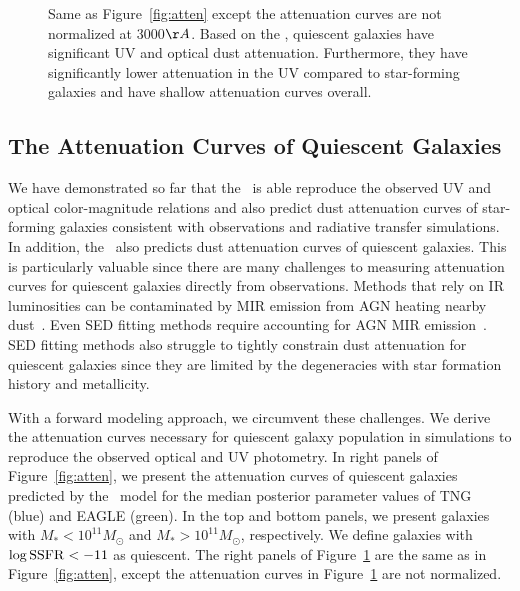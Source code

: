 \begin{figure}
\begin{center}
    \caption{\label{fig:raw_atten}
    Same as Figure~\ref{fig:atten} except the attenuation curves are not
    normalized at 3000$\AA$. Based on the \eda, quiescent galaxies have
    significant UV and optical dust attenuation. Furthermore, they have 
    significantly lower attenuation in the UV compared to star-forming 
    galaxies and have shallow attenuation curves overall.
    }
\end{center}
\end{figure}
\subsection{The Attenuation Curves of Quiescent Galaxies}  
We have demonstrated so far that the \eda~is able reproduce the observed UV and
optical color-magnitude relations and also predict dust attenuation curves
of star-forming galaxies consistent with observations and radiative transfer 
simulations. In addition, the \eda~also predicts dust attenuation curves of
quiescent galaxies. This is particularly valuable since there are many challenges 
to measuring attenuation curves for quiescent galaxies directly from observations. 
Methods that rely on IR luminosities can be contaminated by MIR emission from AGN
heating nearby dust~\cite{kirkpatrick2015}. Even SED fitting methods require 
accounting for AGN MIR emission~\citep{salim2016, leja2018, salim2018}. SED 
fitting methods also struggle to tightly constrain dust attenuation for quiescent 
galaxies since they are limited by the degeneracies with star formation history and 
metallicity.

With a forward modeling approach, we circumvent these challenges. We derive the 
attenuation curves necessary for quiescent galaxy population in simulations to
reproduce the observed optical and UV photometry.  In right panels of
Figure~\ref{fig:atten}, we present the attenuation curves of quiescent galaxies 
predicted by the \eda~model for the median posterior parameter values of TNG (blue) 
and EAGLE (green). In the top and bottom panels, we present galaxies with 
$M_* < 10^{11} M_\odot$ and $M_* > 10^{11} M_\odot$, respectively. 
We define galaxies with $\log {\rm SSFR} < -11$ as quiescent. The right panels 
of Figure~\ref{fig:raw_atten} are the same as in Figure~\ref{fig:atten}, except
the attenuation curves in Figure~\ref{fig:raw_atten} are not normalized. 

